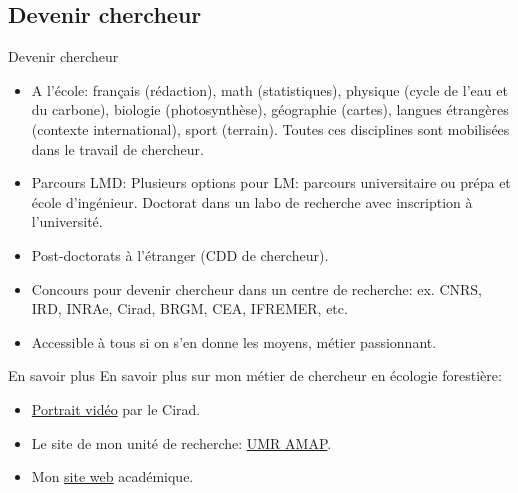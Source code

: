 \documentclass[10pt,table,dvipsnames,compress]{beamer}
\begin{document}
\subsection{Devenir chercheur}
\label{sec:org3ed86cc}

\begin{frame}[label={sec:org91d71c4}]{Devenir chercheur}
\begin{itemize}
\item A l'école: français (rédaction), math (statistiques), physique (cycle de l'eau et du carbone), biologie (photosynthèse), géographie (cartes), langues étrangères (contexte international), sport (terrain). Toutes ces disciplines sont mobilisées dans le travail de chercheur.
\item Parcours LMD: Plusieurs options pour LM: parcours universitaire ou prépa et école d'ingénieur. Doctorat dans un labo de recherche avec inscription à l'université.
\item Post-doctorats à l'étranger (CDD de chercheur).
\item Concours pour devenir chercheur dans un centre de recherche: ex. CNRS, IRD, INRAe, Cirad, BRGM, CEA, IFREMER, etc.
\item Accessible à tous si on s'en donne les moyens, métier passionnant.
\end{itemize}
\end{frame}
\begin{frame}[label={sec:orgc9880ad}]{En savoir plus}
En savoir plus sur mon métier de chercheur en écologie forestière:

\begin{itemize}
\item \href{https://www.youtube.com/watch?v=4kxdB6Jd4Nw}{Portrait vidéo} par le Cirad.
\item Le site de mon unité de recherche: \href{https://amap.cirad.fr}{UMR AMAP}.
\item Mon \href{https://ecology.ghislainv.fr}{site web} académique.
\end{itemize}
\end{frame}
\end{document}
